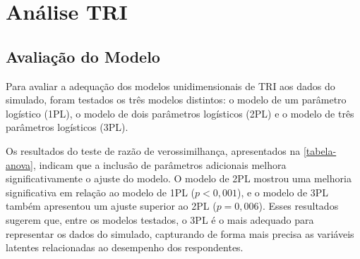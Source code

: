 \newpage
\section{Análise TRI}

\subsection{Avaliação do Modelo}

Para avaliar a adequação dos modelos unidimensionais de TRI aos dados do simulado, foram
testados os três modelos distintos: o modelo de um parâmetro logístico (1PL), o modelo de dois parâmetros logísticos (2PL) e o modelo de três parâmetros logísticos (3PL).

\begin{table}[!htb]
\end{table}



Os resultados do teste de razão de verossimilhança, apresentados na \ref{tabela-anova}, indicam que a inclusão de parâmetros adicionais melhora significativamente o ajuste do modelo. O modelo de 2PL mostrou uma melhoria significativa em relação ao modelo de 1PL ($p < 0,001$), e o modelo de 3PL também apresentou um ajuste superior ao 2PL ($p = 0,006$). Esses resultados sugerem que, entre os modelos testados, o 3PL é o mais adequado para representar os dados do simulado, capturando de forma mais precisa as variáveis latentes relacionadas ao desempenho dos respondentes.

\begin{table}[!htb]
\end{table}


